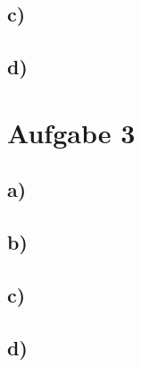 \documentclass[a4paper, 11pt]{article}
\begin{document}
\subsection{c)}
\label{sec:orga18b023}

\subsection{d)}
\label{sec:org3ee73b7}

\section{Aufgabe 3}
\label{sec:org2f659c7}

\subsection{a)}
\label{sec:orgf9a5f2b}

\subsection{b)}
\label{sec:orgb4d02dc}

\subsection{c)}
\label{sec:org2d37f43}

\subsection{d)}
\label{sec:org128a473}
\end{document}
